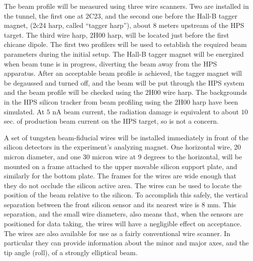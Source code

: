 The beam profile will be measured using three wire scanners. Two are installed in the tunnel, the first one at 2C23, and the second one before the 
Hall-B tagger magnet, (2c24 harp, called ``tagger harp''), about 8 meters upstream of the HPS target. The third wire harp, 2H00 harp, will 
be located just before the first chicane dipole. The first two profilers will be used to establish the required beam parameters during the 
initial setup. The Hall-B tagger magnet will be energized when beam tune is in progress, diverting the beam away from the HPS apparatus.
After an acceptable beam profile is achieved, the tagger magnet will be degaussed and turned off, and the beam 
will be put through the HPS system and the beam profile will be checked using the 2H00 wire harp. 
The backgrounds in the HPS silicon tracker from beam profiling using the 2H00 harp have been simulated. At $5$ nA beam current, the 
radiation damage is equivalent to about $10$ sec. of production beam current on the HPS target, so is not a concern.

A set of tungsten beam-fiducial wires will be installed immediately in front of the silicon detectors in the experiment's analyzing magnet. One horizontal wire, 20 micron diameter, and one 30 micron wire at 9 degrees to the horizontal, will be mounted on a frame attached to the upper movable silicon support plate, and similarly for the bottom plate. The frames for the wires are wide enough that they do not occlude the silicon active area. The wires can be used to locate the position of the beam relative to the silicon. To accomplish this safely, the vertical separation between the front silicon sensor and its nearest wire is 8 mm. This separation, and the small wire diameters, also means that, when the sensors are positioned for data taking, the wires will have a negligible effect on acceptance. The wires are also available for use as a fairly conventional wire scanner. In particular they can provide information about the minor and major axes, and the tip angle (roll), of a strongly elliptical beam.

